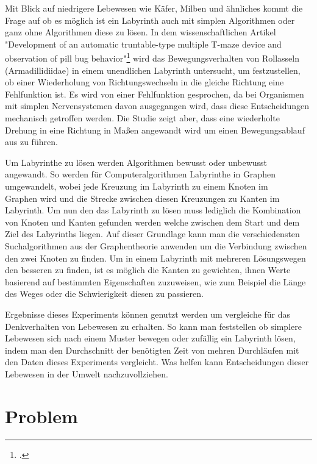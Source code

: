 \documentclass[12pt, a4paper, titlepage]{article}
\begin{document}
\bigskip

Mit Blick auf niedrigere Lebewesen wie Käfer, Milben und ähnliches kommt die Frage auf ob es möglich ist ein Labyrinth auch mit simplen Algorithmen oder ganz ohne Algorithmen diese zu lösen.
In dem wissenschaftlichen Artikel "Development of an automatic truntable-type multiple T-maze device and observation of pill bug behavior"\footcite{bug} wird das Bewegungsverhalten von Rollasseln (Armadillidiidae) in einem unendlichen Labyrinth untersucht, um festzustellen, ob einer Wiederholung von Richtungswechseln in die gleiche Richtung eine Fehlfunktion ist.
Es wird von einer Fehlfunktion gesprochen, da bei Organismen mit simplen Nervensystemen davon ausgegangen wird, dass diese Entscheidungen mechanisch getroffen werden.
Die Studie zeigt aber, dass eine wiederholte Drehung in eine Richtung in Maßen angewandt wird um einen Bewegungsablauf aus zu führen.

\bigskip

Um Labyrinthe zu lösen werden Algorithmen bewusst oder unbewusst angewandt.
So werden für Computeralgorithmen Labyrinthe in Graphen umgewandelt, wobei jede Kreuzung im Labyrinth zu einem Knoten im \\ Graphen wird und die Strecke zwischen diesen Kreuzungen zu Kanten im Labyrinth.
Um nun den das Labyrinth zu lösen muss lediglich die Kombination von Knoten und Kanten gefunden werden welche zwischen dem Start und dem Ziel des Labyrinths liegen.
Auf dieser Grundlage kann man die verschiedensten Suchalgorithmen aus der Graphentheorie anwenden um die Verbindung zwischen den zwei Knoten zu finden.
Um in einem Labyrinth mit mehreren Lösungswegen den besseren zu finden, ist es möglich die Kanten zu gewichten, ihnen Werte basierend auf bestimmten Eigenschaften zuzuweisen, wie zum Beispiel die Länge des Weges oder die Schwierigkeit diesen zu passieren.

\bigskip

Ergebnisse dieses Experiments können genutzt werden um vergleiche für das Denkverhalten von Lebewesen zu erhalten.
So kann man feststellen ob simplere Lebewesen sich nach einem Muster bewegen oder zufällig ein Labyrinth lösen, indem man den Durchschnitt der benötigten Zeit von mehren Durchläufen mit den Daten dieses Experiments vergleicht.
Was helfen kann Entscheidungen dieser Lebewesen in der Umwelt nachzuvollziehen.

\newpage

\section{Problem}
\end{document}
